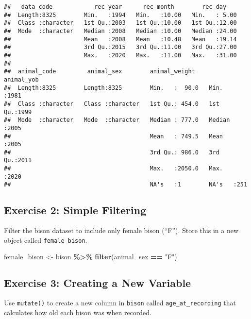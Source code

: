 \documentclass[
]{article}
\newenvironment{Shaded}{\begin{snugshade}}{\end{snugshade}}
\newcommand{\FunctionTok}[1]{\textcolor[rgb]{0.13,0.29,0.53}{\textbf{#1}}}
\newcommand{\NormalTok}[1]{#1}
\newcommand{\OtherTok}[1]{\textcolor[rgb]{0.56,0.35,0.01}{#1}}
\newcommand{\SpecialCharTok}[1]{\textcolor[rgb]{0.81,0.36,0.00}{\textbf{#1}}}
\newcommand{\StringTok}[1]{\textcolor[rgb]{0.31,0.60,0.02}{#1}}
\begin{document}
\begin{verbatim}
##   data_code            rec_year      rec_month        rec_day     
##  Length:8325        Min.   :1994   Min.   :10.00   Min.   : 5.00  
##  Class :character   1st Qu.:2003   1st Qu.:10.00   1st Qu.:12.00  
##  Mode  :character   Median :2008   Median :10.00   Median :24.00  
##                     Mean   :2008   Mean   :10.48   Mean   :19.14  
##                     3rd Qu.:2015   3rd Qu.:11.00   3rd Qu.:27.00  
##                     Max.   :2020   Max.   :11.00   Max.   :31.00  
##                                                                   
##  animal_code         animal_sex        animal_weight      animal_yob  
##  Length:8325        Length:8325        Min.   :  90.0   Min.   :1981  
##  Class :character   Class :character   1st Qu.: 454.0   1st Qu.:1999  
##  Mode  :character   Mode  :character   Median : 777.0   Median :2005  
##                                        Mean   : 749.5   Mean   :2005  
##                                        3rd Qu.: 986.0   3rd Qu.:2011  
##                                        Max.   :2050.0   Max.   :2020  
##                                        NA's   :1        NA's   :251
\end{verbatim}

\subsection{Exercise 2: Simple
Filtering}\label{exercise-2-simple-filtering}

Filter the bison dataset to include only female bison (``F''). Store
this in a new object called \texttt{female\_bison}.

\begin{Shaded}
\begin{Highlighting}[]
\NormalTok{female\_bison }\OtherTok{\textless{}{-}}\NormalTok{ bison }\SpecialCharTok{\%\textgreater{}\%}
  \FunctionTok{filter}\NormalTok{(animal\_sex }\SpecialCharTok{==} \StringTok{"F"}\NormalTok{)}
\end{Highlighting}
\end{Shaded}

\subsection{Exercise 3: Creating a New
Variable}\label{exercise-3-creating-a-new-variable}

Use \texttt{mutate()} to create a new column in \texttt{bison} called
\texttt{age\_at\_recording} that calculates how old each bison was when
recorded.
\end{document}
